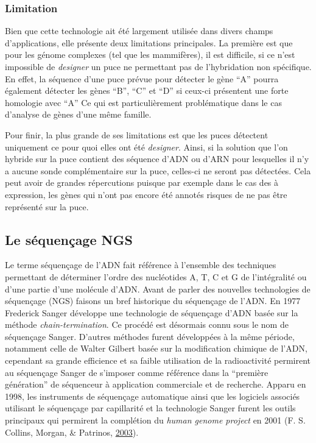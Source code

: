 \documentclass[12pt,twoside]{reedthesis}
\theoremstyle{definition}
\theoremstyle{definition}
\theoremstyle{remark}
\begin{document}
  \subsubsection{Limitation}\label{limitation}
  
  Bien que cette technologie ait été largement utilisée dans divers champs
  d'applications, elle présente deux limitations principales. La première
  est que pour les génome complexes (tel que les mammifères), il est
  difficile, si ce n'est impossible de \emph{designer} un puce ne
  permettant pas de l'hybridation non spécifique. En effet, la séquence
  d'une puce prévue pour détecter le gène ``A'' pourra également détecter
  les gènes ``B'', ``C'' et ``D'' si ceux-ci présentent une forte
  homologie avec ``A'' Ce qui est particulièrement problématique dans le
  cas d'analyse de gènes d'une même famille.
  
  Pour finir, la plus grande de ses limitations est que les puces
  détectent uniquement ce pour quoi elles ont été \emph{designer}. Ainsi,
  si la solution que l'on hybride sur la puce contient des séquence d'ADN
  ou d'ARN pour lesquelles il n'y a aucune sonde complémentaire sur la
  puce, celles-ci ne seront pas détectées. Cela peut avoir de grandes
  répercutions puisque par exemple dans le cas des à expression, les gènes
  qui n'ont pas encore été annotés risques de ne pas être représenté sur
  la puce.
  
  \newpage
  
  \hypertarget{ngs}{\subsection{Le séquençage NGS}\label{ngs}}
  
  Le terme séquençage de l'ADN fait référence à l'ensemble des techniques
  permettant de déterminer l'ordre des nucléotides A, T, C et G de
  l'intégralité ou d'une partie d'une molécule d'ADN. Avant de parler des
  nouvelles technologies de séquençage (NGS) faisons un bref historique du
  séquençage de l'ADN. En 1977 Frederick Sanger développe une technologie
  de séquençage d'ADN basée sur la méthode \emph{chain-termination}. Ce
  procédé est désormais connu sous le nom de séquençage Sanger. D'autres
  méthodes furent développées à la même période, notamment celle de Walter
  Gilbert basée sur la modification chimique de l'ADN, cependant sa grande
  efficience et sa faible utilisation de la radioactivité permirent au
  séquençage Sanger de s'imposer comme référence dans la ``première
  génération'' de séquenceur à application commerciale et de recherche.
  Apparu en 1998, les instruments de séquençage automatique ainsi que les
  logiciels associés utilisant le séquençage par capillarité et la
  technologie Sanger furent les outils principaux qui permirent la
  complétion du \emph{human genome project} en 2001 (F. S. Collins,
  Morgan, \& Patrinos, \protect\hyperlink{ref-Collins2003}{2003}).
  
\end{document}
